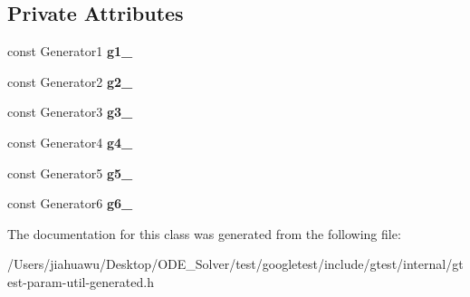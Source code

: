 \subsection*{Private Attributes}
\begin{DoxyCompactItemize}
\item 
\mbox{\label{classtesting_1_1internal_1_1_cartesian_product_holder6_afc75796d0a193b4aa71295d4d5fbf2f9}} 
const Generator1 {\bfseries g1\+\_\+}
\item 
\mbox{\label{classtesting_1_1internal_1_1_cartesian_product_holder6_a185518a6b93cca4e81bb9b5e3ca7da0f}} 
const Generator2 {\bfseries g2\+\_\+}
\item 
\mbox{\label{classtesting_1_1internal_1_1_cartesian_product_holder6_a1af93c009cd3025e89dab8f683b5d8f8}} 
const Generator3 {\bfseries g3\+\_\+}
\item 
\mbox{\label{classtesting_1_1internal_1_1_cartesian_product_holder6_a1990e6efc632ee98355e47d52a3b75d1}} 
const Generator4 {\bfseries g4\+\_\+}
\item 
\mbox{\label{classtesting_1_1internal_1_1_cartesian_product_holder6_a6ad540ef1089ead5b0236cf093ba69bc}} 
const Generator5 {\bfseries g5\+\_\+}
\item 
\mbox{\label{classtesting_1_1internal_1_1_cartesian_product_holder6_a7dd7b7c05d778735c54a6aa72715e609}} 
const Generator6 {\bfseries g6\+\_\+}
\end{DoxyCompactItemize}


The documentation for this class was generated from the following file\+:\begin{DoxyCompactItemize}
\item 
/\+Users/jiahuawu/\+Desktop/\+O\+D\+E\+\_\+\+Solver/test/googletest/include/gtest/internal/gtest-\/param-\/util-\/generated.\+h\end{DoxyCompactItemize}
